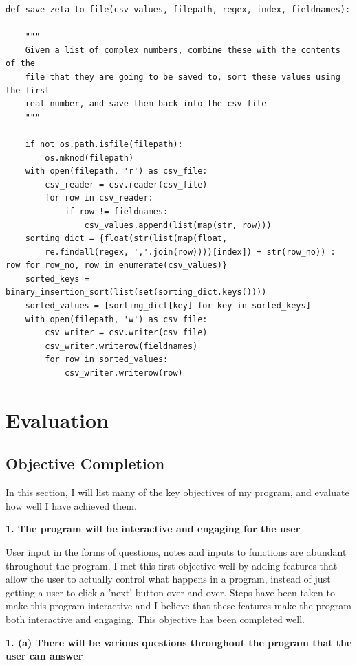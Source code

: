 \documentclass{article}
\begin{document}
\begin{lstlisting}
def save_zeta_to_file(csv_values, filepath, regex, index, fieldnames):

    """
    Given a list of complex numbers, combine these with the contents of the
    file that they are going to be saved to, sort these values using the first
    real number, and save them back into the csv file
    """

    if not os.path.isfile(filepath):
        os.mknod(filepath)
    with open(filepath, 'r') as csv_file:
        csv_reader = csv.reader(csv_file)
        for row in csv_reader:
            if row != fieldnames:
                csv_values.append(list(map(str, row)))
    sorting_dict = {float(str(list(map(float,
        re.findall(regex, ','.join(row))))[index]) + str(row_no)) : row for row_no, row in enumerate(csv_values)}
    sorted_keys = binary_insertion_sort(list(set(sorting_dict.keys())))
    sorted_values = [sorting_dict[key] for key in sorted_keys]
    with open(filepath, 'w') as csv_file:
        csv_writer = csv.writer(csv_file)
        csv_writer.writerow(fieldnames)
        for row in sorted_values:
            csv_writer.writerow(row)
\end{lstlisting}
\clearpage
\section{Evaluation}


\subsection{Objective Completion}

In this section, I will list many of the key objectives of my program, and evaluate how well I have achieved them.

\textbf{1. The program will be interactive and engaging for the user}

User input in the forms of questions, notes and inputs to functions are abundant throughout the program. I met this first objective well by adding features that allow the user to actually control what happens in a program, instead of just getting a user to click a 'next' button over and over. Steps have been taken to make this program interactive and I believe that these features make the program both interactive and engaging. This objective has been completed well.

\textbf{1. (a) There will be various questions throughout the program that the user can answer}
\end{document}
